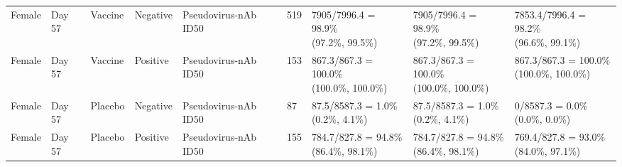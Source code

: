 \documentclass[]{book}
\theoremstyle{definition}
\theoremstyle{definition}
\theoremstyle{definition}
\newcommand{\1}{\mathbbm{1}}
\begin{document}
\begin{landscape}
\begin{ThreePartTable}
\begin{longtable}[t]{>{\raggedright\arraybackslash}p{2.7cm}llllllll}
\hspace{1em}Female & Day 57 & Vaccine & Negative & Pseudovirus-nAb ID50 & 519 & \makecell[l]{7905/7996.4 = 98.9\%\\(97.2\%, 99.5\%)} & \makecell[l]{7905/7996.4 = 98.9\%\\(97.2\%, 99.5\%)} & \makecell[l]{7853.4/7996.4 = 98.2\%\\(96.6\%, 99.1\%)}\\
\hspace{1em}Female & Day 57 & Vaccine & Positive & Pseudovirus-nAb ID50 & 153 & \makecell[l]{867.3/867.3 = 100.0\%\\(100.0\%, 100.0\%)} & \makecell[l]{867.3/867.3 = 100.0\%\\(100.0\%, 100.0\%)} & \makecell[l]{867.3/867.3 = 100.0\%\\(100.0\%, 100.0\%)}\\
\hspace{1em}Female & Day 57 & Placebo & Negative & Pseudovirus-nAb ID50 & 87 & \makecell[l]{87.5/8587.3 = 1.0\%\\(0.2\%, 4.1\%)} & \makecell[l]{87.5/8587.3 = 1.0\%\\(0.2\%, 4.1\%)} & \makecell[l]{0/8587.3 = 0.0\%\\(0.0\%, 0.0\%)}\\
\hspace{1em}Female & Day 57 & Placebo & Positive & Pseudovirus-nAb ID50 & 155 & \makecell[l]{784.7/827.8 = 94.8\%\\(86.4\%, 98.1\%)} & \makecell[l]{784.7/827.8 = 94.8\%\\(86.4\%, 98.1\%)} & \makecell[l]{769.4/827.8 = 93.0\%\\(84.0\%, 97.1\%)}\\*
\end{longtable}
\end{ThreePartTable}


\clearpage


\end{landscape}
\end{document}

